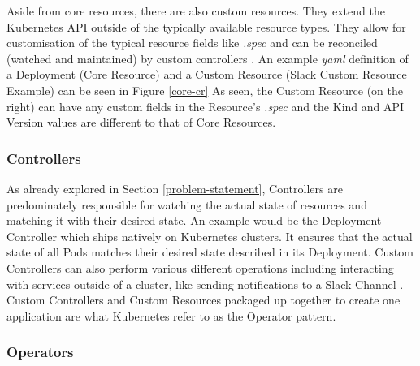 \documentclass{article}
\begin{document}
Aside from core resources, there are also custom resources. They extend the Kubernetes API outside of the typically available resource types. They allow for customisation of the typical resource fields like \emph{.spec} and can be reconciled (watched and maintained) by custom controllers \cite{cust-res}. An example \emph{yaml} definition of a Deployment (Core Resource) and a Custom Resource (Slack Custom Resource Example) can be seen in Figure \ref{core-cr} As seen, the Custom Resource (on the right) can have any custom fields in the Resource's \emph{.spec} and the Kind and API Version values are different to that of Core Resources.



\subsubsection{Controllers} \label{controllers}

As already explored in Section \ref{problem-statement}, Controllers are predominately responsible for watching the actual state of resources and matching it with their desired state. An example would be the Deployment Controller which ships natively on Kubernetes clusters. It ensures that the actual state of all Pods matches their desired state described in its Deployment. Custom Controllers can also perform various different operations including interacting with services outside of a cluster, like sending notifications to a Slack Channel \cite{ctrlrs-ref}. Custom Controllers and Custom Resources packaged up together to create one application are what Kubernetes refer to as the Operator pattern.


\subsubsection{Operators}
\end{document}
